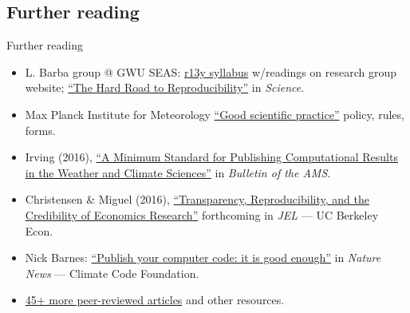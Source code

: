 \documentclass[12pt,aspectratio=169]{beamer}
\begin{document}
\subsection{Further reading}
\begin{frame}{Further reading}
  \begin{itemize}
    \small
    \item L. Barba group @ GWU SEAS: \href{http://lorenabarba.com/blog/barbagroup-reproducibility-syllabus/}{r13y syllabus} w/readings on research group website; \href{http://science.sciencemag.org/content/354/6308/142}{``The Hard Road to Reproducibility''} in \emph{Science}.
    \item Max Planck Institute for Meteorology \href{http://mpimet.mpg.de/en/science/publications/good-scientific-practice.html}{``Good scientific practice''} policy, rules, forms.
    \item Irving (2016), \href{http://journals.ametsoc.org/doi/abs/10.1175/BAMS-D-15-00010.1}{``A Minimum Standard for Publishing Computational Results in the Weather and Climate Sciences''} in \emph{Bulletin of the AMS}.
    \item Christensen \& Miguel (2016), \href{http:/dx.doi.org/10.3386/w22989}{``Transparency, Reproducibility, and the Credibility of Economics Research''} forthcoming in \emph{JEL} — UC Berkeley Econ.
    \item Nick Barnes: \href{https://www.nature.com/news/2010/101013/full/467753a.html}{``Publish your computer code: it is good enough''} in \emph{Nature News} — Climate Code Foundation.
    \item \href{http://ropensci.github.io/reproducibility-guide/sections/references/}{45+ more peer-reviewed articles} and other resources.
  \end{itemize}
\end{frame}
\end{document}
